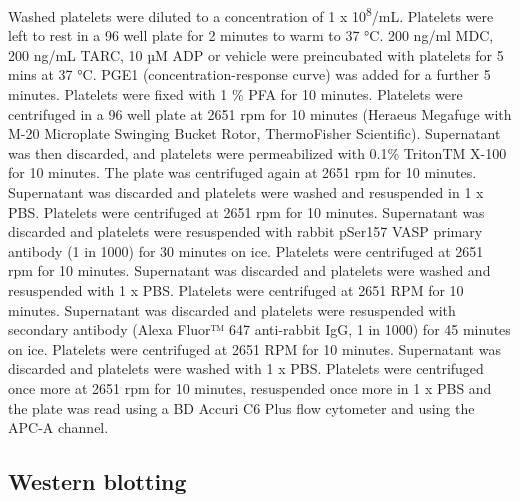 \documentclass[11pt,twoside]{bristolthesis}
\begin{document}
Washed platelets were diluted to a concentration of 1 x 10\textsuperscript{8}/mL. Platelets were left to rest in a 96 well plate for 2 minutes to warm to 37 °C. 200 ng/ml MDC, 200 ng/mL TARC, 10 µM ADP or vehicle were preincubated with platelets for 5 mins at 37 °C. PGE1 (concentration-response curve) was added for a further 5 minutes. Platelets were fixed with 1 \% PFA for 10 minutes. Platelets were centrifuged in a 96 well plate at 2651 rpm for 10 minutes (Heraeus Megafuge with M-20 Microplate Swinging Bucket Rotor, ThermoFisher Scientific). Supernatant was then discarded, and platelets were permeabilized with 0.1\% TritonTM X-100 for 10 minutes. The plate was centrifuged again at 2651 rpm for 10 minutes. Supernatant was discarded and platelets were washed and resuspended in 1 x PBS. Platelets were centrifuged at 2651 rpm for 10 minutes. Supernatant was discarded and platelets were resuspended with rabbit pSer157 VASP primary antibody (1 in 1000) for 30 minutes on ice. Platelets were centrifuged at 2651 rpm for 10 minutes. Supernatant was discarded and platelets were washed and resuspended with 1 x PBS. Platelets were centrifuged at 2651 RPM for 10 minutes. Supernatant was discarded and platelets were resuspended with secondary antibody (Alexa Fluor™ 647 anti-rabbit IgG, 1 in 1000) for 45 minutes on ice. Platelets were centrifuged at 2651 RPM for 10 minutes. Supernatant was discarded and platelets were washed with 1 x PBS. Platelets were centrifuged once more at 2651 rpm for 10 minutes, resuspended once more in 1 x PBS and the plate was read using a BD Accuri C6 Plus flow cytometer and using the APC-A channel.

\hypertarget{western-blotting}{%
\subsection{Western blotting}\label{western-blotting}}
\end{document}
